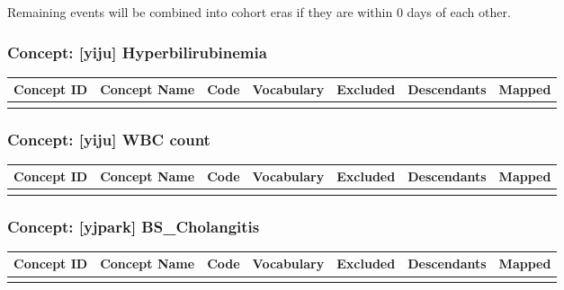 \documentclass[
  12pt,
]{article}
\begin{document}
Remaining events will be combined into cohort eras if they are within 0 days of each other.

\subsubsection{Concept: {[}yiju{]} Hyperbilirubinemia}\label{concept-yiju-hyperbilirubinemia}

\begingroup\fontsize{8}{10}\selectfont

\begin{longtable}{>{\raggedright\arraybackslash}p{5em}>{\raggedright\arraybackslash}p{20em}lllll}
\toprule
Concept ID & Concept Name & Code & Vocabulary & Excluded & Descendants & Mapped\\
\midrule
\cellcolor{gray!10}{4032334} & \cellcolor{gray!10}{Hyperbilirubinemia} & \cellcolor{gray!10}{14783006} & \cellcolor{gray!10}{SNOMED} & \cellcolor{gray!10}{NO} & \cellcolor{gray!10}{YES} & \cellcolor{gray!10}{NO}\\
\bottomrule
\end{longtable}
\endgroup{}

\subsubsection{Concept: {[}yiju{]} WBC count}\label{concept-yiju-wbc-count-1}

\begingroup\fontsize{8}{10}\selectfont

\begin{longtable}{>{\raggedright\arraybackslash}p{5em}>{\raggedright\arraybackslash}p{20em}lllll}
\toprule
Concept ID & Concept Name & Code & Vocabulary & Excluded & Descendants & Mapped\\
\midrule
\cellcolor{gray!10}{3000905} & \cellcolor{gray!10}{Leukocytes [\#/volume] in Blood by Automated count} & \cellcolor{gray!10}{6690-2} & \cellcolor{gray!10}{LOINC} & \cellcolor{gray!10}{NO} & \cellcolor{gray!10}{NO} & \cellcolor{gray!10}{NO}\\
\bottomrule
\end{longtable}
\endgroup{}

\subsubsection{Concept: {[}yjpark{]} BS\_Cholangitis}\label{concept-yjpark-bs_cholangitis}

\begingroup\fontsize{8}{10}\selectfont

\begin{longtable}{>{\raggedright\arraybackslash}p{5em}>{\raggedright\arraybackslash}p{20em}lllll}
\toprule
Concept ID & Concept Name & Code & Vocabulary & Excluded & Descendants & Mapped\\
\midrule
\cellcolor{gray!10}{4267297} & \cellcolor{gray!10}{Acute cholangitis} & \cellcolor{gray!10}{6215006} & \cellcolor{gray!10}{SNOMED} & \cellcolor{gray!10}{NO} & \cellcolor{gray!10}{YES} & \cellcolor{gray!10}{NO}\\
\bottomrule
\end{longtable}
\endgroup{}
\end{document}
